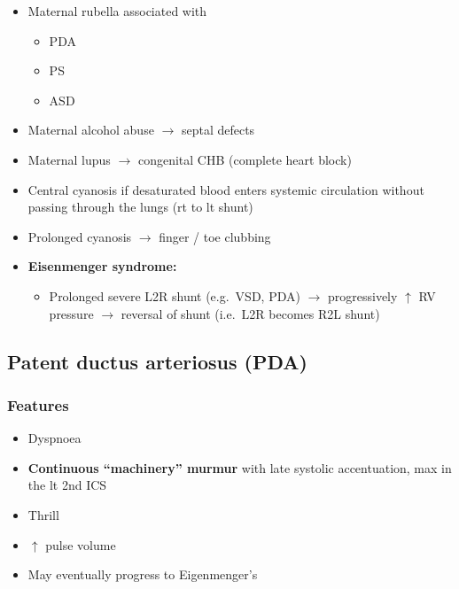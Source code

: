 \documentclass[
  12pt,
]{memoir}
\providecommand{\tightlist}{%
  \setlength{\itemsep}{0pt}\setlength{\parskip}{0pt}}
\begin{document}
\begin{itemize}
\tightlist
\item
  Maternal rubella associated with

  \begin{itemize}
  \tightlist
  \item
    PDA
  \item
    PS
  \item
    ASD
  \end{itemize}
\item
  Maternal alcohol abuse \(\rightarrow\) septal defects
\item
  Maternal lupus \(\rightarrow\) congenital CHB (complete heart block)
\item
  Central cyanosis if desaturated blood enters systemic circulation
  without passing through the lungs (rt to lt shunt)
\item
  Prolonged cyanosis \(\rightarrow\) finger / toe clubbing
\item
  \textbf{Eisenmenger syndrome:}

  \begin{itemize}
  \tightlist
  \item
    Prolonged severe L2R shunt (e.g.~VSD, PDA) \(\rightarrow\)
    progressively \(\uparrow\) RV pressure \(\rightarrow\) reversal of
    shunt (i.e.~L2R becomes R2L shunt)
  \end{itemize}
\end{itemize}

\hypertarget{patent-ductus-arteriosus-pda}{%
\subsection{Patent ductus arteriosus
(PDA)}\label{patent-ductus-arteriosus-pda}}

\hypertarget{features-12}{%
\subsubsection{Features}\label{features-12}}

\begin{itemize}
\tightlist
\item
  Dyspnoea
\item
  \textbf{Continuous ``machinery'' murmur} with late systolic
  accentuation, max in the lt 2nd ICS
\item
  Thrill
\item
  \(\uparrow\) pulse volume
\item
  May eventually progress to Eigenmenger's
\end{itemize}
\end{document}
